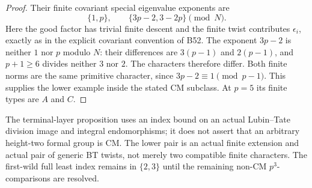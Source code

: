 \begin{proof}
Their finite covariant special eigenvalue exponents are
\[
                 \{1,p\},\qquad \{3p-2,3-2p\}
                 \pmod N.                            \tag{B-RD78.10}
\]
Here the good factor has trivial finite descent and the finite
twist contributes \(\epsilon_i\), exactly as in the explicit
covariant convention of B52. The exponent \(3p-2\) is neither
\(1\) nor \(p\) modulo \(N\): their differences are
\(3(p-1)\) and \(2(p-1)\), and \(p+1\ge6\) divides
neither \(3\) nor \(2\). The characters therefore differ.
Both finite norms are the same primitive character, since
\(3p-2\equiv1\pmod{p-1}\). This supplies the lower example
inside the stated CM subclass. At \(p=5\) its finite types
are \(A\) and \(C\).
\end{proof}

\begin{remark}
\label{rem:B-RD78-scope}
The terminal-layer proposition uses an index bound on an actual
Lubin--Tate division image and integral endomorphisms; it does
not assert that an arbitrary height-two formal group is CM.
The lower pair is an actual finite extension and actual pair
of generic BT twists, not merely two compatible finite characters.
The first-wild full least index remains in \(\{2,3\}\) until
the remaining non-CM \(p^3\)-comparisons are resolved.
\end{remark}
